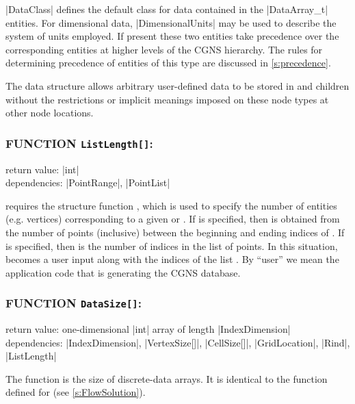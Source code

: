 |DataClass| defines the default class for data contained in the
|DataArray_t| entities.
For dimensional data, |DimensionalUnits| may be used to describe the
system of units employed.
If present these two entities take precedence over the corresponding
entities at higher levels of the CGNS hierarchy.
The rules for determining precedence of entities of this type are
discussed in \autoref{s:precedence}.

The  data structure allows arbitrary
user-defined data to be stored in  and
 children without the restrictions or implicit
meanings imposed on these node types at other node locations.

\subsubsection*{FUNCTION \texttt{ListLength[]}:}

\noindent return value: |int| \\
\noindent dependencies: |PointRange|, |PointList|

 requires the structure function , which
is used to specify the number of entities (e.g. vertices) corresponding to a
given  or . If
 is specified, then  is obtained from
the number of points (inclusive) between the beginning and ending indices of
. If  is specified, then
 is the number of indices in the list of points. In this
situation,  becomes a user input along with the indices of the
list . By ``user'' we mean the application code that is
generating the CGNS database.

\subsubsection*{FUNCTION \texttt{DataSize[]}:}

\noindent return value: one-dimensional |int| array of length
          |IndexDimension| \\
\noindent dependencies: |IndexDimension|, |VertexSize[]|, |CellSize[]|,
          |GridLocation|, |Rind|, |ListLength|

The function  is the size of discrete-data arrays.
It is identical to the function  defined for
 (see \autoref{s:FlowSolution}).

